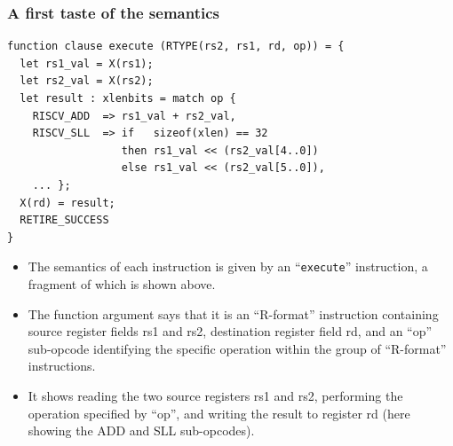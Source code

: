 \documentclass[aspectratio=169]{beamer}
\newcommand{\cf}{\scriptsize\tt}
\begin{document}
\begin{frame}[fragile]
  \frametitle{A first taste of the semantics}

  \scriptsize

  \begin{Verbatim}[frame=single, label = File riscv\_insts\_base.sail]
function clause execute (RTYPE(rs2, rs1, rd, op)) = {
  let rs1_val = X(rs1);
  let rs2_val = X(rs2);
  let result : xlenbits = match op {
    RISCV_ADD  => rs1_val + rs2_val,
    RISCV_SLL  => if   sizeof(xlen) == 32
                  then rs1_val << (rs2_val[4..0])
                  else rs1_val << (rs2_val[5..0]),
    ... };
  X(rd) = result;
  RETIRE_SUCCESS
}
  \end{Verbatim}

  \begin{itemize}
  \item
    The semantics of each instruction is given by an ``{\cf execute}''
    instruction, a fragment of which is shown above.

  \item
    The function argument says that it is an ``R-format'' instruction
    containing source register fields rs1 and rs2, destination
    register field rd, and an ``op'' sub-opcode identifying the
    specific operation within the group of ``R-format'' instructions.

  \item
    It shows reading the two source registers rs1 and rs2, performing
    the operation specified by ``op'', and writing the result to
    register rd (here showing the ADD and SLL sub-opcodes).
  \end{itemize}

\end{frame}

\end{document}
